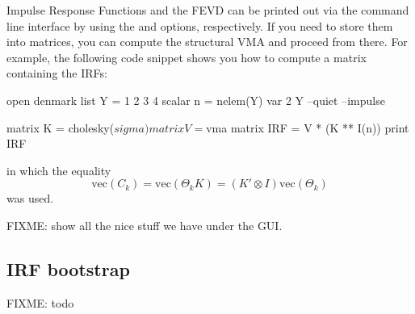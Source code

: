 Impulse Response Functions and the FEVD can be printed out via the
command line interface by using the  and
 options, respectively. If you need to store
them into matrices, you can compute the structural VMA and proceed
from there. For example, the following code snippet shows you how to
compute a matrix containing the IRFs:
\begin{code}
open denmark
list Y = 1 2 3 4
scalar n = nelem(Y)
var 2 Y --quiet --impulse

matrix K = cholesky($sigma)
matrix V = $vma
matrix IRF = V * (K ** I(n))
print IRF
\end{code}
in which the equality
\[
\mathrm{vec}(C_k) = \mathrm{vec}(\Theta_k K) = (K' \otimes I)
\mathrm{vec} (\Theta_k)
\]
was used.

FIXME: show all the nice stuff we have under the GUI.

\subsection{IRF bootstrap}

FIXME: todo 


